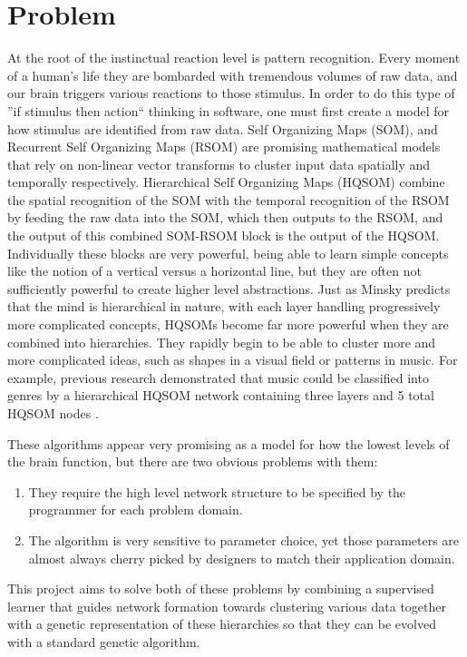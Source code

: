 \documentclass[12pt,a4paper]{article}
\begin{document}
\section{Problem}
At the root of the instinctual reaction level is pattern recognition. Every moment of a human's life they are bombarded with tremendous volumes of raw data, and our brain triggers various reactions to those stimulus.  In order to do this type of ''if stimulus then action`` thinking in software, one must first create a model for how stimulus are identified from raw data.  Self Organizing Maps (SOM), and Recurrent Self Organizing Maps (RSOM) are promising mathematical models that rely on non-linear vector transforms to cluster input data spatially and temporally respectively.  Hierarchical Self Organizing Maps (HQSOM) combine the spatial recognition of the SOM with the temporal recognition of the RSOM by feeding the raw data into the SOM, which then outputs to the RSOM, and the output of this combined SOM-RSOM block is the output of the HQSOM.  Individually these blocks are very powerful, being able to learn simple concepts like the notion of a vertical versus a horizontal line, but they are often not sufficiently powerful to create higher level abstractions.  Just as Minsky predicts that the mind is hierarchical in nature, with each layer handling progressively more complicated concepts, HQSOMs become far more powerful when they are combined into hierarchies.  They rapidly begin to be able to cluster more and more complicated ideas, such as shapes in a visual field or patterns in music.  For example, previous research demonstrated that music could be classified into genres by a hierarchical HQSOM network containing three layers and 5 total HQSOM nodes \cite{MLPaper}.

These algorithms appear very promising as a model for how the lowest levels of the brain function, but there are two obvious problems with them:
\begin{enumerate}
\item They require the high level network structure to be specified by the programmer for each problem domain.
\item The algorithm is very sensitive to parameter choice, yet those parameters are almost always cherry picked by designers to match their application domain.  
\end{enumerate} 

This project aims to solve both of these problems by combining a supervised learner that guides network formation towards clustering various data together with a genetic representation of these hierarchies so that they can be evolved with a standard genetic algorithm.  
\end{document}
